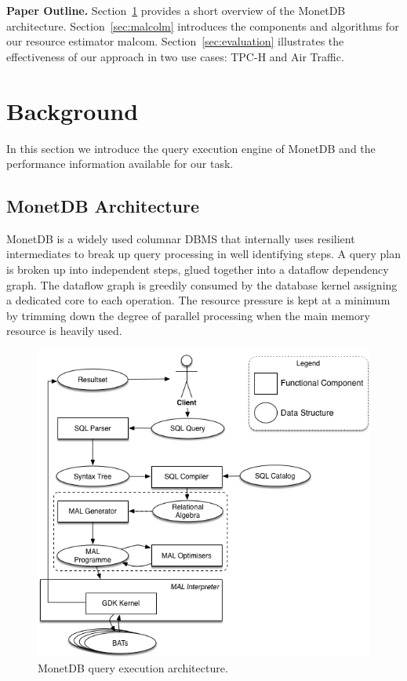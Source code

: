 \documentclass[conference]{IEEEtran}
\def\Skip{\par\medskip\nobreak\noindent}
\begin{document}
\Skip
\textbf{Paper Outline.}
Section~\ref{sec:background} provides a short overview of the MonetDB architecture.%
Section~\ref{sec:malcolm} introduces the components and algorithms for our resource estimator {\sc malcom}.
Section~\ref{sec:evaluation} illustrates the effectiveness of our approach in two use cases: TPC-H and Air Traffic.

\section{Background}
\label{sec:background} 
In this section we introduce the query execution engine of MonetDB and the performance information available for our task.

\subsection{MonetDB Architecture}
MonetDB is a widely used columnar DBMS that internally uses resilient intermediates to break up query processing in well identifying steps. 
A query plan is broken up into independent steps, glued together into a dataflow dependency graph.
The dataflow graph is greedily consumed by the database kernel assigning a dedicated core to each operation.
The resource pressure is kept at a minimum by trimming down the degree of parallel processing when the main memory resource is heavily used.

\begin{figure}[t]
    \centering\includegraphics[width=.95\columnwidth]{Figures/MDB_impl_arch.png}
    \caption{MonetDB query execution architecture.}
    \label{fig:mdb_arch}
\end{figure}
\end{document}
